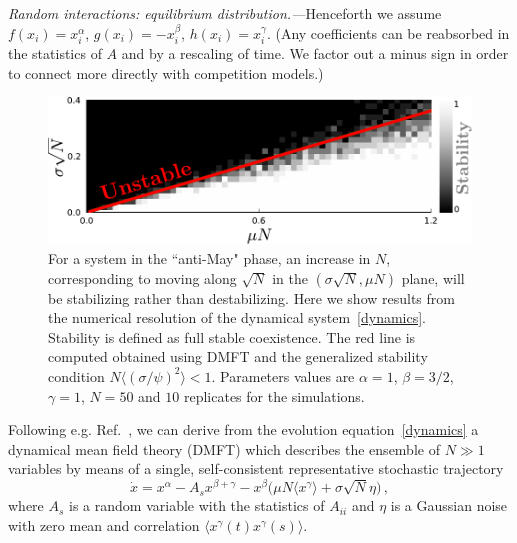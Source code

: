 \emph{Random interactions: equilibrium distribution.---}Henceforth we assume $f(x_i)=x_i^{\alpha}$, $g(x_i)=-x_i^{\beta}$, $h(x_i)=x_i^{\gamma}$. 
(Any coefficients can be reabsorbed in the statistics of $A$ and by a rescaling of time. 
We factor out a minus sign in order to connect more directly with competition models.)

\begin{figure}[t!]
    \includegraphics[width=.45\textwidth]{figs/beta1_5-S50-N10-diversity.pdf}
    \caption{For a system in the ``anti-May" phase, an increase in $N$,
    corresponding to moving along $\sqrt{N}$ in the $(\sigma \sqrt{N},\mu N)$ plane, will be stabilizing rather than destabilizing.
    Here we show results from the numerical resolution of the dynamical system~\eqref{dynamics}. Stability is defined as full stable coexistence. The red line is computed obtained using DMFT and the generalized stability condition $N\langle (\sigma/\psi)^2\rangle < 1$.
    Parameters values are $\alpha=1$, $\beta=3/2$,
    $\gamma=1$, $N=50$ and $10$ replicates for the simulations.}
    \label{fig: stability line + sims}
\end{figure}

Following e.g. Ref.~\cite{Roy2019}, we can derive from the evolution equation~\eqref{dynamics} a dynamical mean field theory (DMFT) 
which describes the ensemble of $N\gg 1$ variables
by means of a single, self-consistent representative stochastic trajectory
\begin{equation}
    \dot{x} = x^{\alpha}-A_sx^{\beta+\gamma}-x^{\beta}\big( \mu N \langle x^{\gamma}\rangle + \sigma \sqrt{N} \eta\big) \, ,
\label{eq: dmft}
\end{equation}
where $A_s$ is a random variable with the statistics of $A_{ii}$ and $\eta$ is a Gaussian noise with zero mean and correlation $\langle x^{\gamma}(t)x^{\gamma}(s)\rangle$. 


